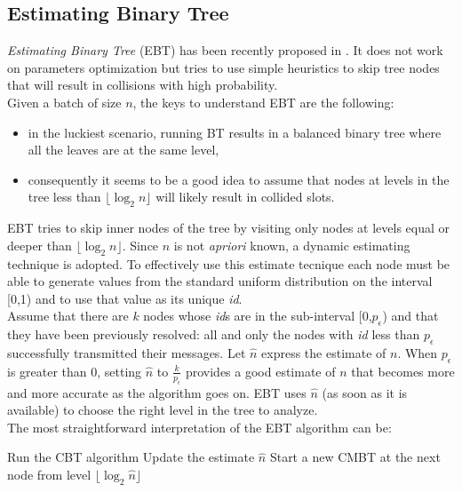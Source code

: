 \documentclass[11pt,a4paper,twoside,openright]{book}
\newcommand{\pc}{p_{\epsilon}}
\newcommand{\algname}[1]{\ensuremath{\mbox{\sc #1}}}
\begin{document}
\subsection{Estimating Binary Tree}
\label{se:EBT}
\emph{Estimating Binary Tree} (EBT) has been recently proposed in \cite{popovski}. It does not work on parameters optimization but tries to use simple heuristics to skip tree nodes that will result in collisions with high probability.\\
Given a batch of size $n$, the keys to understand EBT are the following:
\begin{itemize}
\item in the luckiest scenario, running BT results in a balanced binary tree where all the leaves are at the same level,
\item consequently it seems to be a good idea to assume that nodes at levels in the tree less than $\lfloor \log_{2}n\rfloor$ will likely result in collided slots.
\end{itemize}

EBT tries to skip inner nodes of the tree by visiting only nodes at levels equal or deeper than $\lfloor \log_{2}n\rfloor$. Since $n$ is not \emph{apriori} known, a dynamic estimating technique is adopted. To effectively use this estimate tecnique each node must be able to generate values from the standard uniform distribution on the interval [0,1) and to use that value as its unique \emph{id}.\\
 Assume that there are $k$ nodes whose \emph{id}s are in the sub-interval [0,$\pc$) and that they have been previously resolved: all and only the nodes with \emph{id} less than $\pc$ successfully transmitted their messages.  Let $\hat{n}$ express the estimate of $n$. When $\pc$ is greater than 0, setting $\hat{n}$ to $\displaystyle\frac{k}{\pc}$ provides a good estimate of $n$ that becomes more and more accurate as the algorithm goes on. EBT uses $\hat{n}$ (as soon as it is available) to choose the right level in the tree to analyze.\\
 
 The most straightforward  interpretation of the EBT algorithm can be:

\begin{algorithm}
\caption{\algname{Estimating Binary Tree}}
\begin{algorithmic}
\STATE  Run the CBT algorithm
\STATE  Update the estimate $\hat{n}$
\STATE Start a new CMBT at the next node from level $\lfloor\log_{2}\hat{n}\rfloor$
\ENDWHILE
\end{algorithmic}
\end{algorithm}
\end{document}
